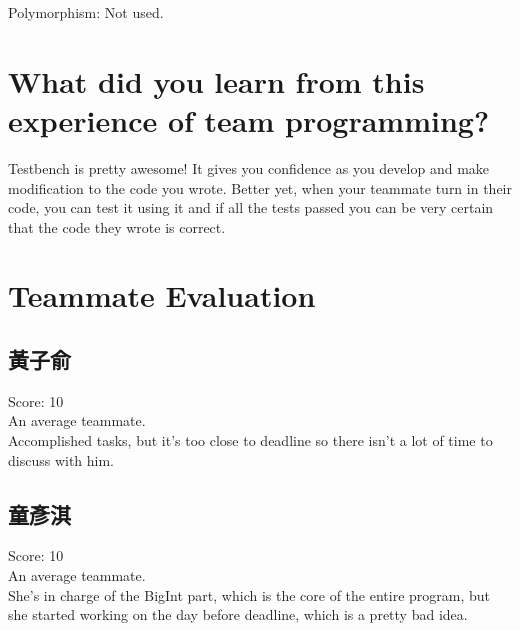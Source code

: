 \documentclass[12pt, A4]{article}
\begin{document}
    Polymorphism: Not used.
    
    \newpage
    
    \section{What did you learn from this experience of team programming?}
    
    Testbench is pretty awesome! It gives you confidence as you develop and make modification to the code you wrote. Better yet, when your teammate turn in their code, you can test it using it and if all the tests passed you can be very certain that the code they wrote is correct.
    
    \section{Teammate Evaluation}
    
    \subsection{黃子俞}
    
    Score: 10\\
    
    An average teammate. \\
    
    Accomplished tasks, but it's too close to deadline so there isn't a lot of time to discuss with him. \\
    
    \subsection{童彥淇}
    
    Score: 10\\
    
    An average teammate. \\
    
    She's in charge of the BigInt part, which is the core of the entire program, but she started working on the day before deadline, which is a pretty bad idea.\\
	
\end{document}
